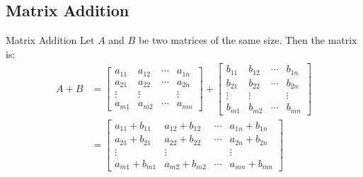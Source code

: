 \documentclass[../notes.tex]{subfiles}
\begin{document}
			\subsection{Matrix Addition}
				\begin{definition}{Matrix Addition}
					Let $A$ and $B$ be two matrices of the same size. Then the matrix  is:
					\begin{align*}
						A + B &= \begin{bmatrix}
							a_{11} & a_{12} & \cdots & a_{1n}\\
							a_{21} & a_{22} & \cdots & a_{2n}\\
							\vdots & \vdots & & \vdots\\
							a_{m1} & a_{m2} & \cdots & a_{mn}
						\end{bmatrix} + \begin{bmatrix}
							b_{11} & b_{12} & \cdots & b_{1n}\\
							b_{21} & b_{22} & \cdots & b_{2n}\\
							\vdots & \vdots & & \vdots\\
							b_{m1} & b_{m2} & \cdots & b_{mn}
						\end{bmatrix}\\
						&= \begin{bmatrix}
							a_{11} + b_{11} & a_{12} + b_{12} & \cdots & a_{1n} + b_{1n}\\
							a_{21} + b_{21} & a_{22} + b_{22} & \cdots & a_{2n} + b_{2n}\\
							\vdots & \vdots & & \vdots\\
							a_{m1} + b_{m1} & a_{m2} + b_{m2} & \cdots & a_{mn} + b_{mn}
						\end{bmatrix}
					\end{align*}
				\end{definition}
\end{document}
